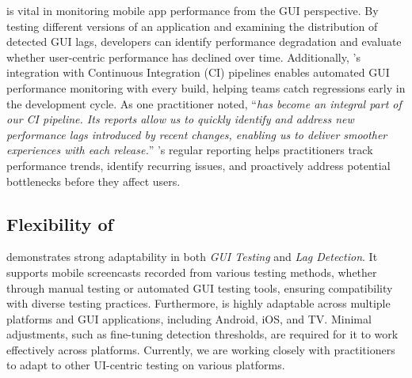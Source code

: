 \tool is vital in monitoring mobile app performance from the GUI perspective. By testing different versions of an application and examining the distribution of detected GUI lags, developers can identify performance degradation and evaluate whether user-centric performance has declined over time. Additionally, \tool’s integration with Continuous Integration (CI) pipelines enables automated GUI performance monitoring with every build, helping teams catch regressions early in the development cycle. As one practitioner noted, ``\textit{\tool has become an integral part of our CI pipeline. Its reports allow us to quickly identify and address new performance lags introduced by recent changes, enabling us to deliver smoother experiences with each release.}''
\tool's regular reporting helps practitioners track performance trends, identify recurring issues, and proactively address potential bottlenecks before they affect users. 


\subsection{Flexibility of \tool}
\tool demonstrates strong adaptability in both \textit{GUI Testing} and \textit{Lag Detection}. It supports mobile screencasts recorded from various testing methods, whether through manual testing or automated GUI testing tools, ensuring compatibility with diverse testing practices.
Furthermore, \tool is highly adaptable across multiple platforms and GUI applications, including Android, iOS, and TV. Minimal adjustments, such as fine-tuning detection thresholds, are required for it to work effectively across platforms. Currently, we are working closely with practitioners to adapt \tool to other UI-centric testing on various platforms.  %



